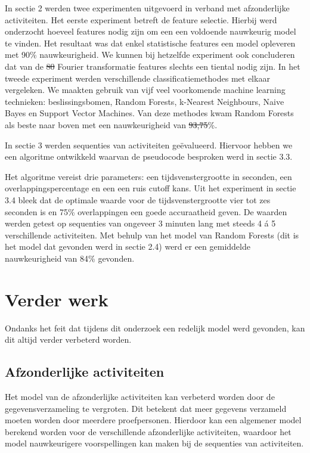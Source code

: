 \documentclass{article}
\providecommand{\DIFadd}[1]{{\protect\color{blue}\uwave{#1}}} %
\providecommand{\DIFdel}[1]{{\protect\color{red}\sout{#1}}}                      %
\providecommand{\DIFaddbegin}{} %
\providecommand{\DIFaddend}{} %
\providecommand{\DIFdelbegin}{} %
\providecommand{\DIFdelend}{} %
\begin{document}
	In sectie 2 werden twee experimenten uitgevoerd in verband met afzonderlijke activiteiten. Het eerste experiment betreft de feature selectie. Hierbij werd onderzocht hoeveel features nodig zijn om een een voldoende nauwkeurig model te vinden. Het resultaat was dat enkel statistische features een model opleveren met 90\% nauwkeurigheid. We kunnen bij hetzelfde experiment ook concluderen dat van de \DIFdelbegin \DIFdel{80 }\DIFdelend \DIFaddbegin \DIFadd{84 }\DIFaddend Fourier transformatie features slechts een tiental nodig zijn.
	In het tweede experiment werden verschillende classificatiemethodes met elkaar vergeleken. We maakten gebruik van vijf veel voorkomende machine learning technieken: beslissingsbomen, Random Forests, k-Nearest Neighbours, Naive Bayes en Support Vector Machines. Van deze methodes kwam Random Forests als beste naar boven met een nauwkeurigheid van \DIFdelbegin \DIFdel{93,75}\DIFdelend \DIFaddbegin \DIFadd{93.75}\DIFaddend \%.

	In sectie 3 werden sequenties van activiteiten ge\"evalueerd. Hiervoor hebben we een algoritme ontwikkeld waarvan de pseudocode besproken werd in sectie 3.3. \DIFdelbegin %

\DIFdelend Het algoritme vereist drie parameters: een tijdsvenstergrootte in seconden, een overlappingspercentage en een een ruis cutoff kans. Uit het experiment in sectie 3.4
bleek dat de optimale waarde voor de tijdsvenstergrootte vier tot zes seconden is en 75\% overlappingen een goede accuraatheid geven. De waarden werden getest op sequenties van ongeveer 3 minuten lang met steeds 4 \'a 5 verschillende activiteiten. Met behulp van het model van Random Forests (dit is het model dat gevonden werd in sectie 2.4) werd er een gemiddelde nauwkeurigheid van 84\% gevonden.



\section{Verder werk}

Ondanks het feit dat tijdens dit onderzoek een redelijk model werd gevonden, kan dit altijd verder verbeterd worden.

\subsection{Afzonderlijke activiteiten}

Het model van de afzonderlijke activiteiten kan verbeterd worden door de gegevensverzameling te vergroten. Dit betekent dat meer gegevens verzameld moeten worden door meerdere proefpersonen. Hierdoor kan een algemener model berekend worden voor de verschillende afzonderlijke activiteiten, waardoor het model nauwkeurigere voorspellingen kan maken bij de sequenties van activiteiten.
\end{document}

